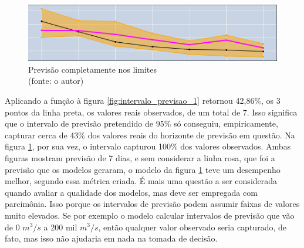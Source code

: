 \begin{figure}[!h]
	\centering
	\includegraphics[scale=0.40]{Figuras/intervalo_previsao_2.png}
	\caption{Previsão completamente nos limites\\(fonte: o autor)}
	\label{fig:intervalo_previsao_2}
\end{figure}

Aplicando a função à figura \ref{fig:intervalo_previsao_1} retornou 42,86\%, os 3 pontos da linha preta, os valores reais observados, de um total de 7. Isso significa que o intervalo de previsão pretendido de 95\% só conseguiu, empiricamente, capturar cerca de 43\% dos valores reais do horizonte de previsão em questão. Na figura \ref{fig:intervalo_previsao_2}, por sua vez, o intervalo capturou 100\% dos valores observados. Ambas figuras mostram previsão de 7 dias, e sem considerar a linha rosa, que foi a previsão que os modelos geraram, o modelo da figura \ref{fig:intervalo_previsao_2} teve um desempenho melhor, segundo essa métrica criada. É mais uma questão a ser considerada quando avaliar a qualidade dos modelos, mas deve ser empregada com parcimônia. Isso porque os intervalos de previsão podem assumir faixas de valores muito elevados. Se por exemplo o modelo calcular intervalos de previsão que vão de 0 $m^3/s$ a 200 mil $m^3/s$, então qualquer valor observado seria capturado, de fato, mas isso não ajudaria em nada na tomada de decisão.


